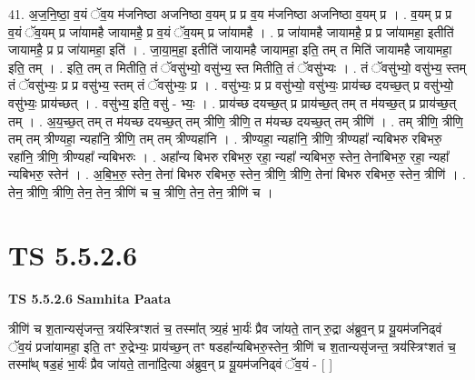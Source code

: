 \documentclass[17pt]{extarticle}
\begin{document}
41. अ॒ज॒नि॒ष्ठा॒ व॒यं ॅव॒य म॑जनिष्ठा अजनिष्ठा व॒यम् प्र प्र व॒य म॑जनिष्ठा अजनिष्ठा व॒यम् प्र । . व॒यम् प्र प्र व॒यं ॅव॒यम् प्र जा॑यामहै जायामहै॒ प्र व॒यं ॅव॒यम् प्र जा॑यामहै । . प्र जा॑यामहै जायामहै॒ प्र प्र जा॑यामहा॒ इतीति॑ जायामहै॒ प्र प्र जा॑यामहा॒ इति॑ । . जा॒या॒म॒हा॒ इतीति॑ जायामहै जायामहा॒ इति॒ तम् त मिति॑ जायामहै जायामहा॒ इति॒ तम् । . इति॒ तम् त मितीति॒ तं ॅवसु॑भ्यो॒ वसु॑भ्य॒ स्त मितीति॒ तं ॅवसु॑भ्यः । . तं ॅवसु॑भ्यो॒ वसु॑भ्य॒ स्तम् तं ॅवसु॑भ्यः॒ प्र प्र वसु॑भ्य॒ स्तम् तं ॅवसु॑भ्यः॒ प्र । . वसु॑भ्यः॒ प्र प्र वसु॑भ्यो॒ वसु॑भ्यः॒ प्राय॑च्छ दयच्छ॒त् प्र वसु॑भ्यो॒ वसु॑भ्यः॒ प्राय॑च्छत् । . वसु॑भ्य॒ इति॒ वसु॑ - भ्यः॒ । . प्राय॑च्छ दयच्छ॒त् प्र प्राय॑च्छ॒त् तम् त म॑यच्छ॒त् प्र प्राय॑च्छ॒त् तम् । . अ॒य॒च्छ॒त् तम् त म॑यच्छ दयच्छ॒त् तम् त्रीणि॒ त्रीणि॒ त म॑यच्छ दयच्छ॒त् तम् त्रीणि॑ । . तम् त्रीणि॒ त्रीणि॒ तम् तम् त्रीण्यहा॒ न्यहा॑नि॒ त्रीणि॒ तम् तम् त्रीण्यहा॑नि । . त्रीण्यहा॒ न्यहा॑नि॒ त्रीणि॒ त्रीण्यहा᳚ न्यबिभरु रबिभरु॒ रहा॑नि॒ त्रीणि॒ त्रीण्यहा᳚ न्यबिभरुः । . अहा᳚न्य बिभरु रबिभरु॒ रहा॒ न्यहा᳚ न्यबिभरु॒ स्तेन॒ तेना॑बिभरु॒ रहा॒ न्यहा᳚ न्यबिभरु॒ स्तेन॑ । . अ॒बि॒भ॒रु॒ स्तेन॒ तेना॑ बिभरु रबिभरु॒ स्तेन॒ त्रीणि॒ त्रीणि॒ तेना॑ बिभरु रबिभरु॒ स्तेन॒ त्रीणि॑ । . तेन॒ त्रीणि॒ त्रीणि॒ तेन॒ तेन॒ त्रीणि॑ च च॒ त्रीणि॒ तेन॒ तेन॒ त्रीणि॑ च । \newline
\pagebreak
{}

\section{ TS 5.5.2.6 }

\textbf{TS 5.5.2.6 } \newline
\textbf{Samhita Paata} \newline

त्रीणि॑ च श॒तान्यसृ॑जन्त॒ त्रय॑स्त्रिꣳशतं च॒ तस्मा᳚त् त्र्य॒हं भा॒र्यः॑ प्रैव जा॑यते॒ तान् रु॒द्रा अ॑ब्रुव॒न् प्र यू॒यम॑जनिढ्वं ॅव॒यं प्रजा॑यामहा॒ इति॒ तꣳ रु॒द्रेभ्यः॒ प्राय॑च्छ॒न् तꣳ षडहा᳚न्यबिभरु॒स्तेन॒ त्रीणि॑ च श॒तान्यसृ॑जन्त॒ त्रय॑स्त्रिꣳशतं च॒ तस्मा᳚थ् षड॒हं भा॒र्यः॑ प्रैव जा॑यते॒ ताना॑दि॒त्या अ॑ब्रुव॒न् प्र यू॒यम॑जनिढ्वं ॅव॒यं - [  ] \newline
\end{document}
